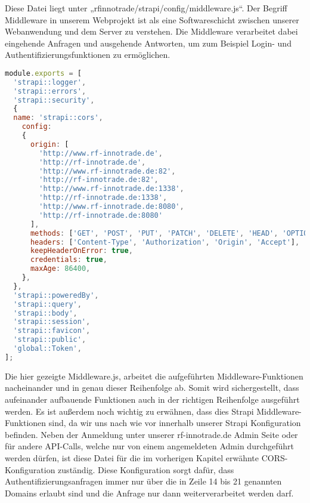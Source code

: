 Diese Datei liegt unter „rfinnotrade/strapi/config/middleware.js“.
Der Begriff Middleware in unserem Webprojekt ist als eine Softwareschicht zwischen unserer Webanwendung und dem Server zu verstehen. Die Middleware verarbeitet dabei eingehende Anfragen und ausgehende Antworten, um zum Beispiel Login- und Authentifizierungsfunktionen zu ermöglichen.

\begin{lstlisting}[language=JavaScript, caption={Middlewares.js}, label={lst:middlewaresjs}]
module.exports = [
  'strapi::logger',
  'strapi::errors',
  'strapi::security',
  {
  name: 'strapi::cors',
    config: 
    {
      origin: [
        'http://www.rf-innotrade.de',
        'http://rf-innotrade.de',
        'http://www.rf-innotrade.de:82',
        'http://rf-innotrade.de:82',
        'http://www.rf-innotrade.de:1338',
        'http://rf-innotrade.de:1338',
        'http://www.rf-innotrade.de:8080',
        'http://rf-innotrade.de:8080'
      ],
      methods: ['GET', 'POST', 'PUT', 'PATCH', 'DELETE', 'HEAD', 'OPTIONS'],
      headers: ['Content-Type', 'Authorization', 'Origin', 'Accept'],
      keepHeaderOnError: true,
      credentials: true,
      maxAge: 86400,
    },
  },
  'strapi::poweredBy',
  'strapi::query',
  'strapi::body',
  'strapi::session',
  'strapi::favicon',
  'strapi::public',
  'global::Token',
];
\end{lstlisting}

Die hier gezeigte Middleware.js, arbeitet die aufgeführten Middleware-Funktionen nacheinander und in genau dieser Reihenfolge ab. Somit wird sichergestellt, dass aufeinander aufbauende Funktionen auch in der richtigen Reihenfolge ausgeführt werden. Es ist außerdem noch wichtig zu erwähnen, dass dies Strapi Middleware-Funktionen sind, da wir uns nach wie vor innerhalb unserer Strapi Konfiguration befinden.
Neben der Anmeldung unter unserer rf-innotrade.de Admin Seite oder für andere API-Calls, welche nur von einem angemeldeten Admin durchgeführt werden dürfen, ist diese Datei für die im vorherigen Kapitel erwähnte CORS-Konfiguration zuständig.
Diese Konfiguration sorgt dafür, dass Authentifizierungsanfragen immer nur über die in Zeile 14 bis 21 genannten Domains erlaubt sind und die Anfrage nur dann weiterverarbeitet werden darf.
